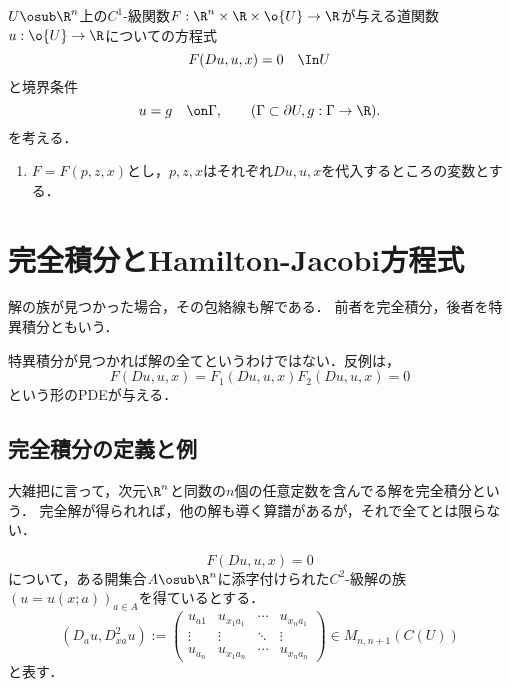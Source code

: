 \documentclass[uplatex,dvipdfmx]{jsreport}
\begin{document}
\begin{problem}
    $U\osub\R^n$上の$C^1$-級関数$F:\R^n\times\R\times\o{U}\to\R$が与える道関数$u:\o{U}\to\R$についての方程式
    \[F(Du,u,x)=0\quad\In U\]
    と境界条件
    \[u=g\quad\on\Gamma,\qquad(\Gamma\subset\partial U,g:\Gamma\to\R).\]
    を考える．
\end{problem}

\begin{notation}\mbox{}
    \begin{enumerate}
        \item $F=F(p,z,x)$とし，$p,z,x$はそれぞれ$Du,u,x$を代入するところの変数とする．
    \end{enumerate}
\end{notation}



\section{完全積分とHamilton-Jacobi方程式}

\begin{tcolorbox}[colframe=ForestGreen, colback=ForestGreen!10!white,breakable,colbacktitle=ForestGreen!40!white,coltitle=black,fonttitle=\bfseries\sffamily,
title=]
    解の族が見つかった場合，その包絡線も解である．
    前者を完全積分，後者を特異積分ともいう．
\end{tcolorbox}

\begin{remark}
    特異積分が見つかれば解の全てというわけではない．反例は，
    \[F(Du,u,x)=F_1(Du,u,x)F_2(Du,u,x)=0\]
    という形のPDEが与える．
\end{remark}

\subsection{完全積分の定義と例}

\begin{tcolorbox}[colframe=ForestGreen, colback=ForestGreen!10!white,breakable,colbacktitle=ForestGreen!40!white,coltitle=black,fonttitle=\bfseries\sffamily,
title=]
    大雑把に言って，次元$\R^n$と同数の$n$個の任意定数を含んでる解を完全積分という．
    完全解が得られれば，他の解も導く算譜があるが，それで全てとは限らない．
\end{tcolorbox}

\begin{problem}
    \begin{equation}\label{eq-5-1}
        F(Du,u,x)=0
    \end{equation}
    について，ある開集合$A\osub\R^n$に添字付けられた$C^2$-級解の族$(u=u(x;a))_{a\in A}$を得ているとする．
    \[(D_au,D_{xa}^2u):=\begin{pmatrix}u_{a1}&u_{x_1a_1}&\cdots&u_{x_na_1}\\\vdots&\vdots&\ddots&\vdots\\u_{a_n}&u_{x_1a_n}&\cdots&u_{x_na_n}\end{pmatrix} \in M_{n,n+1}(C(U))\]
    と表す．
\end{problem}
\end{document}
